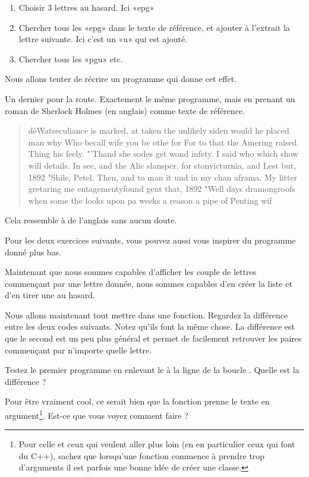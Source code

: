 \begin{enumerate}
    \item
        Choisir 3 lettres au hasard. Ici «epg» 
    \item
        Chercher tous les «epg» dans le texte de référence, et ajouter à l'extrait la lettre suivante. Ici c'est un «u» qui est ajouté.
    \item
        Chercher tous les «pgu» etc.
\end{enumerate}

Nous allons tenter de récrire un programme qui donne cet effet.


Un dernier pour la route. Exactement le même programme, mais en prenant un roman de Sherlock Holmes (en anglais) comme texte de référence.
\begin{quote}
dèWatseculiance is marked, at taken the unlikely siden would he placed man why Who becall wife you be othe for For to that the Amering raised. Thing his feely. "'Thand she sodes get wond infety. I said who which show will details. In see, and the Alic slansper, for stonvicturnia, and Lest but, 1892 "Shile, Petel. Then, and to man it und in my chan aframa. My litter gretaring me entagementyfound gent that, 1892 "Well days dramongroofs when some the looks upon pa weeks a reason a pipe of Penting wif
\end{quote}
Cela ressemble à de l'anglais sans aucun doute.

Pour les deux exercices suivants, vous pouvez aussi vous inspirer du programme  donné plus bas.

Maintenant que nous sommes capables d'afficher les couple de lettres commençant par une lettre donnée, nous sommes capables d'en créer la liste et d'en tirer une au hasard.


Nous allons maintenant tout mettre dans une fonction. Regardez la différence entre les deux codes suivants. Notez qu'ils font la même chose. La différence est que le second est un peu plus général et permet de facilement retrouver les paires commençant par n'importe quelle lettre.





Testez le premier programme en enlevant le \info{[1:]} à la ligne de la boucle . Quelle est la différence ?

Pour être vraiment cool, ce serait bien que la fonction  prenne le texte en argument\footnote{Pour celle et ceux qui veulent aller plus loin (en en particulier ceux qui font du C++), sachez que lorsqu'une fonction commence à prendre trop d'arguments il est parfois une bonne idée de créer une classe.}. Est-ce que vous voyez comment faire ?

